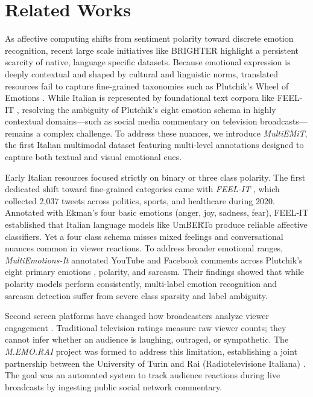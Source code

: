 \section{Related Works}
\label{sec:related_works}

As affective computing shifts from sentiment polarity \cite{SOMSA} toward discrete emotion recognition, recent large scale initiatives like BRIGHTER \cite{brighter_project} highlight a persistent scarcity of native, language specific datasets. Because emotional expression is deeply contextual and shaped by cultural and linguistic norms, translated resources fail to capture fine-grained taxonomies such as Plutchik's Wheel of Emotions \cite{Plutchik}. While Italian is represented by foundational text corpora like FEEL-IT \cite{bianchi2021feel}, resolving the ambiguity of Plutchik's eight emotion schema in highly contextual domains—such as social media commentary on television broadcasts—remains a complex challenge. To address these nuances, we introduce \textit{MultiEMiT}, the first Italian multimodal dataset featuring multi-level annotations designed to capture both textual and visual emotional cues.

Early Italian resources focused strictly on binary or three class polarity. The first dedicated shift toward fine-grained categories came with \textit{FEEL-IT} \cite{bianchi2021feel}, which collected 2,037 tweets across politics, sports, and healthcare during 2020. Annotated with Ekman's four basic emotions (anger, joy, sadness, fear), FEEL-IT established that Italian language models like UmBERTo \cite{musixmatch-2020-umberto} produce reliable affective classifiers. Yet a four class schema misses mixed feelings and conversational nuances common in viewer reactions. To address broader emotional ranges, \textit{MultiEmotions-It} \cite{MultiEmotion} annotated YouTube and Facebook comments across Plutchik's eight primary emotions \cite{Plutchik}, polarity, and sarcasm. Their findings showed that while polarity models perform consistently, multi-label emotion recognition and sarcasm detection suffer from severe class sparsity and label ambiguity.

Second screen platforms have changed how broadcasters analyze viewer engagement \cite{SocialTV}. Traditional television ratings measure raw viewer counts; they cannot infer whether an audience is laughing, outraged, or sympathetic. The \textit{M.EMO.RAI} project was formed to address this limitation, establishing a joint partnership between the University of Turin and Rai (Radiotelevisione Italiana) \cite{memorai}. The goal was an automated system to track audience reactions during live broadcasts by ingesting public social network commentary.

